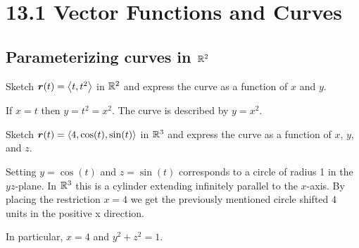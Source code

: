\documentclass[12pt]{exam}
\newcommand{\qdate}{13.1 Vector Functions and Curves} %
\begin{document}
\section*{\qdate}


\subsection*{Parameterizing curves in \(\mathbb{R}^2\)}

\begin{questions}

\question Sketch \(\bm{r}(t)=\left\langle t,t^2 \right\rangle\) in  \(\mathbb{R}^2\) and express the curve as a function of  \(x\) and \(y\). 
        \ifprintanswers
            \begin{solution}
                If \(x=t\) then \(y=t^2=x^2\). The curve is described by \(y=x^2\).

            \end{solution}
        \else
            \vfill
        \fi

\question Sketch \(\bm{r}(t)=\left\langle 4,\cos(t),\sin(t) \right\rangle\) in \(\mathbb{R}^3\) and express the curve as a function of \(x\), \(y\), and \(z\).
        \ifprintanswers
            \begin{solution}
                Setting \(y=\cos(t)\) and \(z=\sin(t)\) corresponds to a circle of radius 1 in the \(yz\)-plane. In \(\mathbb{R}^3\) this is a cylinder extending infinitely parallel to the \(x\)-axis. By placing the restriction \(x=4\) we get the previously mentioned circle shifted 4 units in the positive x direction.
                
                In particular, \(x=4\) and \(y^2+z^2=1\).

                \begin{center}
                \end{center}
            \end{solution}
        \else
            \vfill
        \fi


\end{questions}
\end{document}
